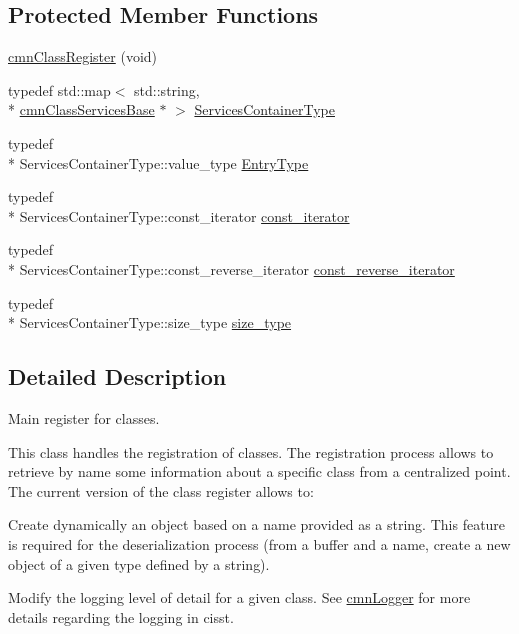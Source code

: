 \subsection*{Protected Member Functions}
\begin{DoxyCompactItemize}
\item 
\hyperlink{classcmn_class_register_a7dfc2396cd035f150c84d7f2aa1286b8}{cmn\-Class\-Register} (void)
\end{DoxyCompactItemize}
\begin{DoxyCompactItemize}
\item 
typedef std\-::map$<$ std\-::string, \\*
\hyperlink{classcmn_class_services_base}{cmn\-Class\-Services\-Base} $\ast$ $>$ \hyperlink{classcmn_class_register_afad21d7d550eea4f0e0ce5209e7fc437}{Services\-Container\-Type}
\item 
typedef \\*
Services\-Container\-Type\-::value\-\_\-type \hyperlink{classcmn_class_register_ac19a6e242b59d7f0336be30be97fabaf}{Entry\-Type}
\item 
typedef \\*
Services\-Container\-Type\-::const\-\_\-iterator \hyperlink{classcmn_class_register_aacfef62640c83b00064eba6c1f667e26}{const\-\_\-iterator}
\item 
typedef \\*
Services\-Container\-Type\-::const\-\_\-reverse\-\_\-iterator \hyperlink{classcmn_class_register_afdce6482c138fc3c4cb611f0ef7c7a08}{const\-\_\-reverse\-\_\-iterator}
\item 
typedef \\*
Services\-Container\-Type\-::size\-\_\-type \hyperlink{classcmn_class_register_ac90771194c85a9fff753d9d623071b01}{size\-\_\-type}
\end{DoxyCompactItemize}


\subsection{Detailed Description}
Main register for classes. 

This class handles the registration of classes. The registration process allows to retrieve by name some information about a specific class from a centralized point. The current version of the class register allows to\-:


\begin{DoxyItemize}
\item Create dynamically an object based on a name provided as a string. This feature is required for the deserialization process (from a buffer and a name, create a new object of a given type defined by a string).
\item Modify the logging level of detail for a given class. See \hyperlink{classcmn_logger}{cmn\-Logger} for more details regarding the logging in cisst.
\end{DoxyItemize}

